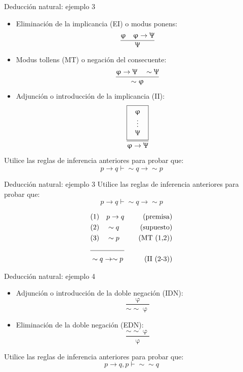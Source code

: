 \documentclass{beamer}
\begin{document}
\begin{frame}{Deducción natural: ejemplo 3}
  \begin{itemize}
    \item Eliminación de la implicancia (EI) o modus ponens:
    $$\dfrac{\upvarphi \quad \upvarphi \rightarrow \Uppsi}{\Uppsi}$$

    \item Modus tollens (MT) o negación del consecuente:
    $$\dfrac{\upvarphi \rightarrow \Uppsi \quad \sim \Uppsi}{\sim \upvarphi}$$

    \item Adjunción o introducción de la implicancia (II):
          \begin{equation*}
            \frac{
              \fbox{
                $\begin{array}{c}
                  \upvarphi \\
                  \vdots \\
                  \Uppsi
                \end{array}$
              }
            }{\upvarphi \rightarrow \Uppsi}
          \end{equation*}
  \end{itemize}

  Utilice las reglas de inferencia anteriores para probar que:
  $$p \rightarrow q \vdash \sim q \rightarrow \sim p$$
\end{frame}


\begin{frame}{Deducción natural: ejemplo 3}
  Utilice las reglas de inferencia anteriores para probar que:
  $$p \rightarrow q \vdash \sim q \rightarrow \sim p$$

  \begin{align*}
    &(1) \quad p \rightarrow q  & \quad (\text{premisa}) \\
    &(2) \quad \sim q  & \quad (\text{supuesto}) \\
    &(3) \quad \sim p  & \quad (\text{MT (1,2)}) \\
    \cline{1-2}
    &\sim q \rightarrow \sim p & \quad (\text{II (2-3)})
  \end{align*}

\end{frame}


\begin{frame}{Deducción natural: ejemplo 4}
  \begin{itemize}
    \item Adjunción o introducción de la doble negación (IDN):
    $$\dfrac{\upvarphi}{\sim \sim \upvarphi}$$

    \item Eliminación de la doble negación (EDN):
    $$\dfrac{\sim \sim \upvarphi}{\upvarphi}$$
  \end{itemize}

  Utilice las reglas de inferencia anteriores para probar que:
  $$p \rightarrow q, p \vdash \sim \sim q$$
\end{frame}
\end{document}
